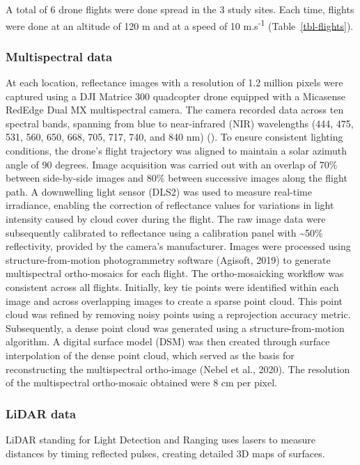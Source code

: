 \documentclass[
  letterpaper,
  DIV=11,
  numbers=noendperiod]{scrartcl}
\begin{document}
A total of 6 drone flights were done spread in the 3 study sites. Each
time, flights were done at an altitude of 120 m and at a speed of 10
m.s\textsuperscript{-1} (Table~\ref{tbl-flights}).

\subsubsection{Multispectral data}\label{sec-photo}

At each location, reflectance images with a resolution of 1.2 million
pixels were captured using a DJI Matrice 300 quadcopter drone equipped
with a Micasense RedEdge Dual MX multispectral camera. The camera
recorded data across ten spectral bands, spanning from blue to
near-infrared (NIR) wavelengths (444, 475, 531, 560, 650, 668, 705, 717,
740, and 840 nm) (). To ensure consistent lighting conditions, the
drone's flight trajectory was aligned to maintain a solar azimuth angle
of 90 degrees. Image acquisition was carried out with an overlap of 70\%
between side-by-side images and 80\% between successive images along the
flight path. A downwelling light sensor (DLS2) was used to measure
real-time irradiance, enabling the correction of reflectance values for
variations in light intensity caused by cloud cover during the flight.
The raw image data were subsequently calibrated to reflectance using a
calibration panel with \textasciitilde50\% reflectivity, provided by the
camera's manufacturer. Images were processed using structure-from-motion
photogrammetry software (Agisoft, 2019) to generate multispectral
ortho-mosaics for each flight. The ortho-mosaicking workflow was
consistent across all flights. Initially, key tie points were identified
within each image and across overlapping images to create a sparse point
cloud. This point cloud was refined by removing noisy points using a
reprojection accuracy metric. Subsequently, a dense point cloud was
generated using a structure-from-motion algorithm. A digital surface
model (DSM) was then created through surface interpolation of the dense
point cloud, which served as the basis for reconstructing the
multispectral ortho-image (Nebel et al., 2020). The resolution of the
multispectral ortho-mosaic obtained were 8 cm per pixel.

\subsubsection{LiDAR data}\label{lidar-data}

LiDAR standing for Light Detection and Ranging uses lasers to measure
distances by timing reflected pulses, creating detailed 3D maps of
surfaces.
\end{document}

